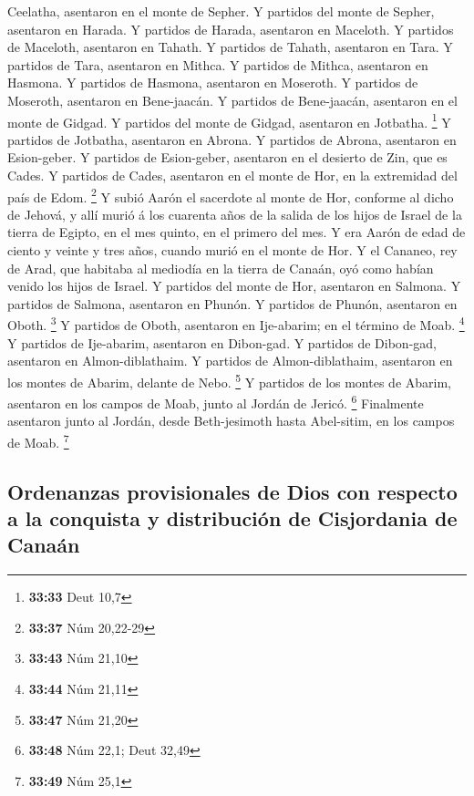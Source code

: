 Ceelatha, asentaron en el monte de Sepher.  Y partidos del
monte de Sepher, asentaron en Harada.  Y partidos de
Harada, asentaron en Maceloth.  Y partidos de Maceloth,
asentaron en Tahath.  Y partidos de Tahath, asentaron en
Tara.  Y partidos de Tara, asentaron en Mithca.
 Y partidos de Mithca, asentaron en Hasmona. 
Y partidos de Hasmona, asentaron en Moseroth.  Y partidos
de Moseroth, asentaron en Bene-jaacán.  Y partidos de
Bene-jaacán, asentaron en el monte de Gidgad.  Y partidos
del monte de Gidgad, asentaron en Jotbatha. \footnote{\textbf{33:33}
  Deut 10,7}  Y partidos de Jotbatha, asentaron en Abrona.
 Y partidos de Abrona, asentaron en Esion-geber.
 Y partidos de Esion-geber, asentaron en el desierto de
Zin, que es Cades.  Y partidos de Cades, asentaron en el
monte de Hor, en la extremidad del país de Edom. \footnote{\textbf{33:37}
  Núm 20,22-29}  Y subió Aarón el sacerdote al monte de
Hor, conforme al dicho de Jehová, y allí murió á los cuarenta años de la
salida de los hijos de Israel de la tierra de Egipto, en el mes quinto,
en el primero del mes.  Y era Aarón de edad de ciento y
veinte y tres años, cuando murió en el monte de Hor.  Y el
Cananeo, rey de Arad, que habitaba al mediodía en la tierra de Canaán,
oyó como habían venido los hijos de Israel.  Y partidos del
monte de Hor, asentaron en Salmona.  Y partidos de Salmona,
asentaron en Phunón.  Y partidos de Phunón, asentaron en
Oboth. \footnote{\textbf{33:43} Núm 21,10}  Y partidos de
Oboth, asentaron en Ije-abarim; en el término de Moab. \footnote{\textbf{33:44}
  Núm 21,11}  Y partidos de Ije-abarim, asentaron en
Dibon-gad.  Y partidos de Dibon-gad, asentaron en
Almon-diblathaim.  Y partidos de Almon-diblathaim,
asentaron en los montes de Abarim, delante de Nebo. \footnote{\textbf{33:47}
  Núm 21,20}  Y partidos de los montes de Abarim, asentaron
en los campos de Moab, junto al Jordán de Jericó. \footnote{\textbf{33:48}
  Núm 22,1; Deut 32,49}  Finalmente asentaron junto al
Jordán, desde Beth-jesimoth hasta Abel-sitim, en los campos de Moab.
\footnote{\textbf{33:49} Núm 25,1}

\hypertarget{ordenanzas-provisionales-de-dios-con-respecto-a-la-conquista-y-distribuciuxf3n-de-cisjordania-de-canauxe1n}{%
\subsection{Ordenanzas provisionales de Dios con respecto a la conquista
y distribución de Cisjordania de
Canaán}\label{ordenanzas-provisionales-de-dios-con-respecto-a-la-conquista-y-distribuciuxf3n-de-cisjordania-de-canauxe1n}}


